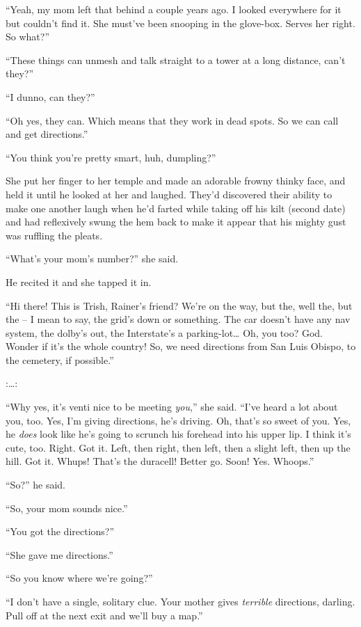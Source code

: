 “Yeah, my mom left that behind a couple years ago. I looked 
everywhere for it but couldn't find it. She must've been snooping in 
the glove-box. Serves her right. So what?”

“These things can unmesh and talk straight to a tower at a long 
distance, can't they?”

“I dunno, can they?”

“Oh yes, they can. Which means that they work in dead spots. So we 
can call and get directions.”

“You think you're pretty smart, huh, dumpling?”

She put her finger to her temple and made an adorable frowny thinky 
face, and held it until he looked at her and laughed. They'd discovered 
their ability to make one another laugh when he'd farted while taking 
off his kilt (second date) and had reflexively swung the hem back to 
make it appear that his mighty gust was ruffling the pleats.

“What's your mom's number?” she said.

He recited it and she tapped it in.

“Hi there! This is Trish, Rainer's friend? We're on the way, but the, 
well the, but the -- I mean to say, the grid's down or something. The 
car doesn't have any nav system, the dolby's out, the Interstate's a 
parking-lot\ldots{} Oh, you too? God. Wonder if it's the whole country! So, 
we need directions from San Luis Obispo, to the cemetery, if 
possible.”

:\ldots{}:

“Why yes, it's venti nice to be meeting \emph{you},” she said. 
“I've heard a lot about you, too. Yes, I'm giving directions, he's 
driving. Oh, that's so sweet of you. Yes, he \emph{does} look like he's 
going to scrunch his forehead into his upper lip. I think it's cute, 
too. Right. Got it. Left, then right, then left, then a slight left, 
then up the hill. Got it. Whups! That's the duracell! Better go. Soon! 
Yes. Whoops.”

“So?” he said.

“So, your mom sounds nice.”

“You got the directions?”

“She gave me directions.”

“So you know where we're going?”

“I don't have a single, solitary clue. Your mother gives 
\emph{terrible} directions, darling. Pull off at the next exit and 
we'll buy a map.”

